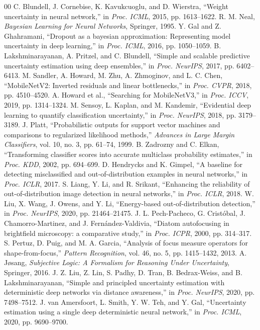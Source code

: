 \documentclass[conference]{IEEEtran}
\begin{document}
\begin{thebibliography}{00}
 C. Blundell, J. Cornebise, K. Kavukcuoglu, and D. Wierstra, ``Weight uncertainty in neural network,'' in \emph{Proc. ICML}, 2015, pp. 1613--1622.
 R. M. Neal, \emph{Bayesian Learning for Neural Networks}, Springer, 1995.
 Y. Gal and Z. Ghahramani, ``Dropout as a bayesian approximation: Representing model uncertainty in deep learning,'' in \emph{Proc. ICML}, 2016, pp. 1050--1059.
 B. Lakshminarayanan, A. Pritzel, and C. Blundell, ``Simple and scalable predictive uncertainty estimation using deep ensembles,'' in \emph{Proc. NeurIPS}, 2017, pp. 6402--6413.
 M. Sandler, A. Howard, M. Zhu, A. Zhmoginov, and L. C. Chen, ``MobileNetV2: Inverted residuals and linear bottlenecks,'' in \emph{Proc. CVPR}, 2018, pp. 4510--4520.
 A. Howard et al., ``Searching for MobileNetV3,'' in \emph{Proc. ICCV}, 2019, pp. 1314--1324.
 M. Sensoy, L. Kaplan, and M. Kandemir, ``Evidential deep learning to quantify classification uncertainty,'' in \emph{Proc. NeurIPS}, 2018, pp. 3179--3189.
 J. Platt, ``Probabilistic outputs for support vector machines and comparisons to regularized likelihood methods,'' \emph{Advances in Large Margin Classifiers}, vol. 10, no. 3, pp. 61--74, 1999.
 B. Zadrozny and C. Elkan, ``Transforming classifier scores into accurate multiclass probability estimates,'' in \emph{Proc. KDD}, 2002, pp. 694--699.
 D. Hendrycks and K. Gimpel, ``A baseline for detecting misclassified and out-of-distribution examples in neural networks,'' in \emph{Proc. ICLR}, 2017.
 S. Liang, Y. Li, and R. Srikant, ``Enhancing the reliability of out-of-distribution image detection in neural networks,'' in \emph{Proc. ICLR}, 2018.
 W. Liu, X. Wang, J. Owens, and Y. Li, ``Energy-based out-of-distribution detection,'' in \emph{Proc. NeurIPS}, 2020, pp. 21464--21475.
 J. L. Pech-Pacheco, G. Crist{\'o}bal, J. Chamorro-Martinez, and J. Fern{\'a}ndez-Valdivia, ``Diatom autofocusing in brightfield microscopy: a comparative study,'' in \emph{Proc. ICPR}, 2000, pp. 314--317.
 S. Pertuz, D. Puig, and M. A. Garcia, ``Analysis of focus measure operators for shape-from-focus,'' \emph{Pattern Recognition}, vol. 46, no. 5, pp. 1415--1432, 2013.
 A. J{\o}sang, \emph{Subjective Logic: A Formalism for Reasoning Under Uncertainty}, Springer, 2016.
 J. Z. Liu, Z. Lin, S. Padhy, D. Tran, B. Bedrax-Weiss, and B. Lakshminarayanan, ``Simple and principled uncertainty estimation with deterministic deep networks via distance awareness,'' in \emph{Proc. NeurIPS}, 2020, pp. 7498--7512.
 J. van Amersfoort, L. Smith, Y. W. Teh, and Y. Gal, ``Uncertainty estimation using a single deep deterministic neural network,'' in \emph{Proc. ICML}, 2020, pp. 9690--9700.
\end{thebibliography}
\end{document}
